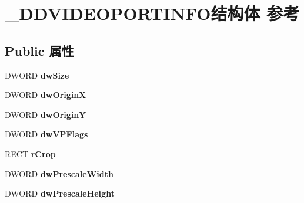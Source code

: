 \hypertarget{struct___d_d_v_i_d_e_o_p_o_r_t_i_n_f_o}{}\section{\+\_\+\+D\+D\+V\+I\+D\+E\+O\+P\+O\+R\+T\+I\+N\+F\+O结构体 参考}
\label{struct___d_d_v_i_d_e_o_p_o_r_t_i_n_f_o}
\subsection*{Public 属性}
\begin{DoxyCompactItemize}
\item 
\mbox{\label{struct___d_d_v_i_d_e_o_p_o_r_t_i_n_f_o_afcac1489028fdaf42644a0eb7947018b}} 
D\+W\+O\+RD {\bfseries dw\+Size}
\item 
\mbox{\label{struct___d_d_v_i_d_e_o_p_o_r_t_i_n_f_o_a13cbd2354447f62bfbdf8ec8339671f7}} 
D\+W\+O\+RD {\bfseries dw\+OriginX}
\item 
\mbox{\label{struct___d_d_v_i_d_e_o_p_o_r_t_i_n_f_o_a05b2d45fd4502fa06b16c229594aa9a6}} 
D\+W\+O\+RD {\bfseries dw\+OriginY}
\item 
\mbox{\label{struct___d_d_v_i_d_e_o_p_o_r_t_i_n_f_o_afa03baab2e95067b03490f7ed134e991}} 
D\+W\+O\+RD {\bfseries dw\+V\+P\+Flags}
\item 
\mbox{\label{struct___d_d_v_i_d_e_o_p_o_r_t_i_n_f_o_a06399ddb2d892074d0d7576287b47806}} 
\hyperlink{structtag_r_e_c_t}{R\+E\+CT} {\bfseries r\+Crop}
\item 
\mbox{\label{struct___d_d_v_i_d_e_o_p_o_r_t_i_n_f_o_a03afa68dd90b91b7477cd5a0def17c5f}} 
D\+W\+O\+RD {\bfseries dw\+Prescale\+Width}
\item 
\mbox{\label{struct___d_d_v_i_d_e_o_p_o_r_t_i_n_f_o_aeb7413282898de72e3440d12cac2ae17}} 
D\+W\+O\+RD {\bfseries dw\+Prescale\+Height}
\item 
\mbox{\label{struct___d_d_v_i_d_e_o_p_o_r_t_i_n_f_o_ae8ca768f50e748aae4b23fedbbab4b41}} 

\end{DoxyCompactItemize}

